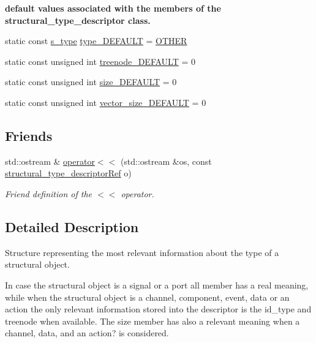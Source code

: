 \begin{Indent}\textbf{ default values associated with the members of the structural\+\_\+type\+\_\+descriptor class.}\par
\begin{DoxyCompactItemize}
\item 
static const \hyperlink{structstructural__type__descriptor_ae12552f84c02a972c2a084901b94cd13}{s\+\_\+type} \hyperlink{structstructural__type__descriptor_aa3639f196b6102423c2bc30717ede815}{type\+\_\+\+D\+E\+F\+A\+U\+LT} = \hyperlink{structstructural__type__descriptor_ae12552f84c02a972c2a084901b94cd13a94b50b104b7eecf7b84aa4a7473bfb3a}{O\+T\+H\+ER}
\item 
static const unsigned int \hyperlink{structstructural__type__descriptor_ae75ae7cc8308c33891ef7896e74ea169}{treenode\+\_\+\+D\+E\+F\+A\+U\+LT} = 0
\item 
static const unsigned int \hyperlink{structstructural__type__descriptor_aa02f9377cabbcc9359fb7f1fa77e85db}{size\+\_\+\+D\+E\+F\+A\+U\+LT} = 0
\item 
static const unsigned int \hyperlink{structstructural__type__descriptor_a5040be48c7c1996629a6c251fb8342d5}{vector\+\_\+size\+\_\+\+D\+E\+F\+A\+U\+LT} = 0
\end{DoxyCompactItemize}
\end{Indent}
\subsection*{Friends}
\begin{DoxyCompactItemize}
\item 
std\+::ostream \& \hyperlink{structstructural__type__descriptor_a5598f0251c669add1d461f39e942841a}{operator$<$$<$} (std\+::ostream \&os, const \hyperlink{structural__objects_8hpp_a219296792577e3292783725961506c83}{structural\+\_\+type\+\_\+descriptor\+Ref} o)
\begin{DoxyCompactList}\small\item\em Friend definition of the $<$$<$ operator. \end{DoxyCompactList}\end{DoxyCompactItemize}


\subsection{Detailed Description}
Structure representing the most relevant information about the type of a structural object. 

In case the structural object is a signal or a port all member has a real meaning, while when the structural object is a channel, component, event, data or an action the only relevant information stored into the descriptor is the id\+\_\+type and treenode when available. The size member has also a relevant meaning when a channel, data, and an action? is considered. 

